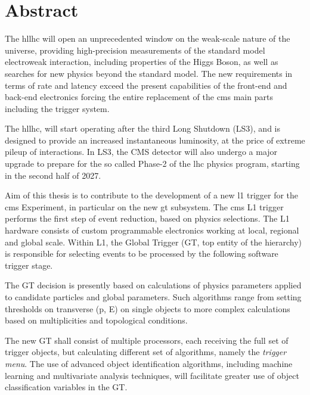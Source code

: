 \documentclass[../../main.tex]{subfiles}
\begin{document}
    \chapter{Abstract}
    
    \label{sec:Abstract}

    The \acrfull{hllhc} will open an unprecedented window on the weak-scale nature of the universe, providing high-precision measurements of the standard model electroweak interaction, including properties of the Higgs Boson, as well as searches for new physics beyond the standard model. The new requirements in terms of rate and latency exceed the present capabilities of the front-end and back-end electronics forcing the entire replacement of the \acrshort{cms} main parts including the trigger system.
    
    The \acrshort{hllhc}, will start operating after the third Long Shutdown (LS3), and is designed to provide an increased instantaneous luminosity, at the price of extreme pileup of interactions. In LS3, the CMS detector will also undergo a major upgrade to prepare for the so called Phase-2 of the \acrshort{lhc} physics program, starting in the second half of 2027.
    
    Aim of this thesis is to contribute to the development of a new \acrfull{l1} trigger for the \acrshort{cms} Experiment, in particular on the new \acrfull{gt} subsystem. The \acrshort{cms} L1 trigger performs the first step of event reduction, based on physics selections. The L1 hardware consists of custom programmable electronics working at local, regional and global scale. Within L1, the Global Trigger (GT, top entity of the hierarchy) is responsible for selecting events to be processed by the following software trigger stage.  
    
    The GT decision is presently based on calculations of physics parameters applied to candidate particles and global parameters. Such algorithms range from setting thresholds on transverse (p, E) on single objects to more complex calculations based on multiplicities and topological conditions.  
    
    The new GT shall consist of multiple processors, each receiving the full set of trigger objects, but calculating different set of algorithms, namely the \textit{trigger menu}. The use of advanced object identification algorithms, including machine learning and multivariate analysis techniques, will facilitate greater use of object classification variables in the GT. 
    
\end{document}
